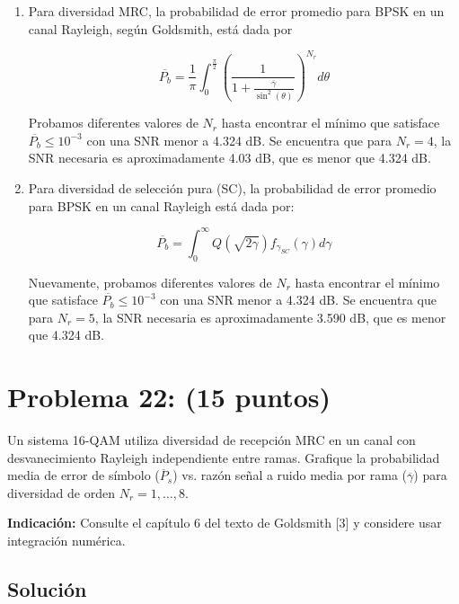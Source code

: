 \documentclass[11pt]{article}
\begin{document}
\begin{enumerate}
    \item Para diversidad MRC, la probabilidad de error promedio para BPSK en un canal Rayleigh, según Goldsmith, está dada por
    
    \[
    \overline{P_b} = \frac{1}{\pi} \int_{0}^{\frac{\pi}{2}} \left( \frac{1}{1 + \frac{\overline{\gamma}}{\sin^2(\theta)}} \right)^{N_r} d\theta
    \]

    Probamos diferentes valores de $N_r$ hasta encontrar el mínimo que satisface $\overline{P_b} \leq 10^{-3}$ con una SNR menor a 4.324 dB. Se encuentra que para $N_r = 4$, la SNR necesaria es aproximadamente 4.03 dB, que es menor que 4.324 dB.

    \item Para diversidad de selección pura (SC), la probabilidad de error promedio para BPSK en un canal Rayleigh está dada por:
    
    \[
    \overline{P_b} = \int_{0}^{\infty} Q\left(\sqrt{2\gamma}\right) f_{\gamma_{SC}}(\gamma) d\gamma
    \]

    Nuevamente, probamos diferentes valores de $N_r$ hasta encontrar el mínimo que satisface $\overline{P_b} \leq 10^{-3}$ con una SNR menor a 4.324 dB. Se encuentra que para $N_r = 5$, la SNR necesaria es aproximadamente 3.590 dB, que es menor que 4.324 dB.

\end{enumerate}



\section*{Problema 22: (15 puntos)}

Un sistema 16-QAM utiliza diversidad de recepción MRC en un canal con desvanecimiento Rayleigh independiente entre ramas. Grafique la probabilidad media de error de símbolo ($\overline{P}_s$) vs. razón señal a ruido media por rama ($\overline{\gamma}$) para diversidad de orden $N_r = 1, \ldots, 8$.

\textbf{Indicación:} Consulte el capítulo 6 del texto de Goldsmith [3] y considere usar integración numérica.

\subsection*{Solución}
\end{document}
